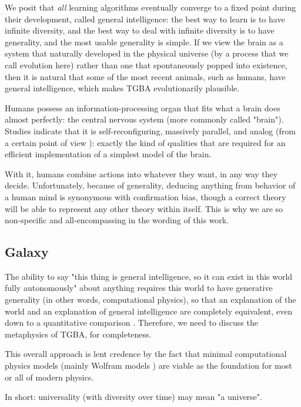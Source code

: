 \documentclass{article}
\begin{document}
We posit that \textit{all} learning algorithms eventually converge to a fixed point during their development, called general intelligence: the best way to learn is to have infinite diversity, and the best way to deal with infinite diversity is to have generality, and the most usable generality is simple. If we view the brain as a system that naturally developed in the physical universe (by a process that we call evolution here) rather than one that spontaneously popped into existence, then it is natural that some of the most recent animals, such as humans, have general intelligence, which makes TGBA evolutionarily plausible.

Humans possess an information-processing organ that fits what a brain does almost perfectly: the central nervous system (more commonly called "brain"). Studies indicate that it is self-reconfiguring, massively parallel, and analog (from a certain point of view \cite{HODGKIN1952}): exactly the kind of qualities that are required for an efficient implementation of a simplest model of the brain.

With it, humans combine actions into whatever they want, in any way they decide. Unfortunately, because of generality, deducing anything from behavior of a human mind is synonymous with confirmation bias, though a correct theory will be able to represent any other theory within itself. This is why we are so non-specific and all-encompassing in the wording of this work.

\subsection{Galaxy}

The ability to say "this thing is general intelligence, so it can exist in this world fully autonomously" about anything requires this world to have generative generality (in other words, computational physics), so that an explanation of the world and an explanation of general intelligence are completely equivalent, even down to a quantitative comparison \cite{10.3389/fphy.2020.525731}. Therefore, we need to discuss the metaphysics of TGBA, for completeness.

This overall approach is lent credence by the fact that minimal computational physics models (mainly Wolfram models \cite{Wolfram_2020}) are viable as the foundation for most or all of modern physics.

In short: universality (with diversity over time) may mean "a universe".
\end{document}
